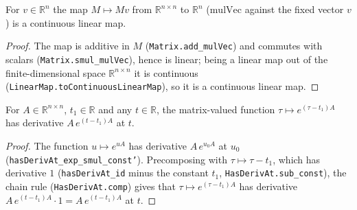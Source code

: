 \begin{lemma}
    \label{lem:mulVec_right_clm}
    \leanok
    For $v \in \mathbb{R}^{n}$ the map $M \mapsto M v$ from $\mathbb{R}^{n \times
    n}$ to $\mathbb{R}^{n}$ ($\mathrm{mulVec}$ against the fixed vector $v$) is a
    continuous linear map.
\end{lemma}
\begin{proof}
    The map is additive in $M$ (\texttt{Matrix.add\_mulVec}) and commutes with
    scalars (\texttt{Matrix.smul\_mulVec}), hence is linear; being a linear
    map out of the finite-dimensional space $\mathbb{R}^{n \times n}$ it is
    continuous (\texttt{LinearMap.toContinuousLinearMap}), so it is a continuous
    linear map.
\end{proof}

\begin{lemma}
    \label{lem:exp_smul_hasDerivAt}
    \leanok
    For $A \in \mathbb{R}^{n \times n}$, $t_1 \in \mathbb{R}$ and any $t \in
    \mathbb{R}$, the matrix-valued function $\tau \mapsto e^{(\tau - t_1) A}$ has
    derivative $A\, e^{(t - t_1)A}$ at $t$.
\end{lemma}
\begin{proof}
    The function $u \mapsto e^{u A}$ has derivative $A\, e^{u_0 A}$ at $u_0$
    (\texttt{hasDerivAt\_exp\_smul\_const'}). Precomposing with $\tau \mapsto
    \tau - t_1$, which has derivative $1$ (\texttt{hasDerivAt\_id} minus the
    constant $t_1$, \texttt{HasDerivAt.sub\_const}), the chain rule
    (\texttt{HasDerivAt.comp}) gives that $\tau \mapsto e^{(\tau - t_1)A}$ has
    derivative $A\, e^{(t-t_1)A} \cdot 1 = A\, e^{(t-t_1)A}$ at $t$.
\end{proof}

